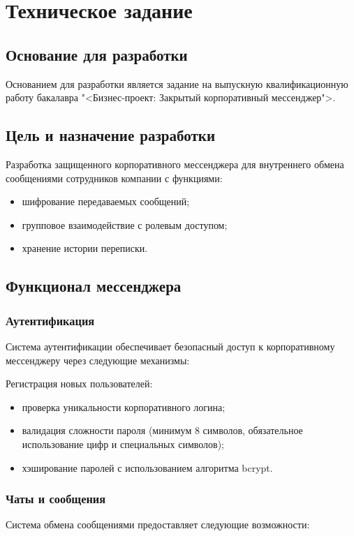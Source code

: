 \section{Техническое задание}
\subsection{Основание для разработки}

Основанием для разработки является задание на выпускную квалификационную работу бакалавра "<Бизнес-проект: Закрытый корпоративный мессенджер">.

\subsection{Цель и назначение разработки}

Разработка защищенного корпоративного мессенджера для внутреннего обмена сообщениями сотрудников компании с функциями:
\begin{itemize}
	\item шифрование передаваемых сообщений;
	\item групповое взаимодействие с ролевым доступом;
	\item хранение истории переписки.
\end{itemize}

	
\subsection{Функционал мессенджера}

\subsubsection{Аутентификация}
Система аутентификации обеспечивает безопасный доступ к корпоративному мессенджеру через следующие механизмы:

Регистрация новых пользователей:

	\begin{itemize}
		\item проверка уникальности корпоративного логина;
		\item валидация сложности пароля (минимум 8 символов, обязательное использование цифр и специальных символов);
		\item хэширование паролей с использованием алгоритма bcrypt.
	\end{itemize}

\subsubsection{Чаты и сообщения}
Система обмена сообщениями предоставляет следующие возможности:


